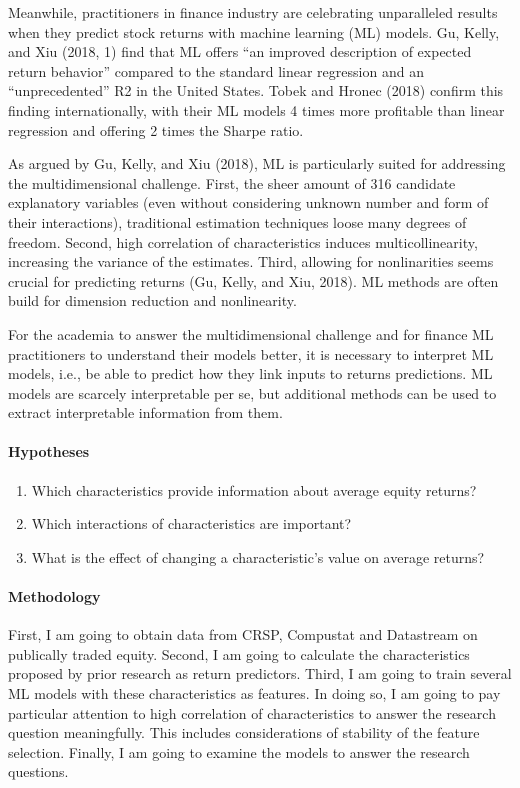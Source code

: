 Meanwhile, practitioners in finance industry are celebrating unparalleled results when they predict stock returns with machine learning (ML) models. Gu, Kelly, and Xiu  (2018, 1) find that ML offers “an improved description of expected return behavior” compared to the standard linear regression and an “unprecedented” R2 in the United States. Tobek and Hronec (2018) confirm this finding internationally, with their ML models 4 times more profitable than linear regression and offering 2 times the Sharpe ratio. 

As argued by Gu, Kelly, and Xiu (2018), ML is particularly suited for addressing the multidimensional challenge. First, the sheer amount of 316 candidate explanatory variables (even without considering unknown number and form of their interactions), traditional estimation techniques loose many degrees of freedom. Second, high correlation of characteristics induces multicollinearity, increasing the variance of the estimates. Third, allowing for nonlinarities seems crucial for predicting returns (Gu, Kelly, and Xiu, 2018). ML methods are often build for dimension reduction and nonlinearity. 

For the academia to answer the multidimensional challenge and for finance ML practitioners to understand their models better, it is necessary to interpret ML models, i.e., be able to predict how they link inputs to returns predictions. ML models are scarcely interpretable per se, but additional methods can be used to extract interpretable information from them.



\paragraph{Hypotheses}

\begin{enumerate}
\item	Which characteristics provide information about average equity returns?
\item	Which interactions of characteristics are important? 
\item	What is the effect of changing a characteristic’s value on average returns? 
\end{enumerate}


\paragraph{Methodology}

First, I am going to obtain data from CRSP, Compustat and Datastream on publically traded equity. Second, I am going to calculate the characteristics proposed by prior research as return predictors. Third, I am going to train several ML models with these characteristics as features. In doing so, I am going to pay particular attention to high correlation of characteristics to answer the research question meaningfully. This includes considerations of stability of the feature selection. Finally, I am going to examine the models to answer the research questions. 

